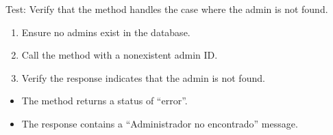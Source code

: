 \documentclass[letterpaper,10pt,english]{sphinxmanual}
\begin{document}
\begin{fulllineitems}
\label{\detokenize{test:test.test_admin.test_update_admin_email_not_found}}
\pysigstartsignatures
\pysiglinewithargsret
{}
{}
{}
\pysigstopsignatures
\sphinxAtStartPar
Test: Verify that the method handles the case where the admin is not found.
\begin{description}
\begin{enumerate}
%
\item {} 
\sphinxAtStartPar
Ensure no admins exist in the database.

\item {} 
\sphinxAtStartPar
Call the  method with a non\sphinxhyphen{}existent admin ID.

\item {} 
\sphinxAtStartPar
Verify the response indicates that the admin is not found.

\end{enumerate}

\begin{itemize}
\item {} 
\sphinxAtStartPar
The method returns a status of “error”.

\item {} 
\sphinxAtStartPar
The response contains a “Administrador no encontrado” message.

\end{itemize}

\end{description}

\end{fulllineitems}

\end{document}
